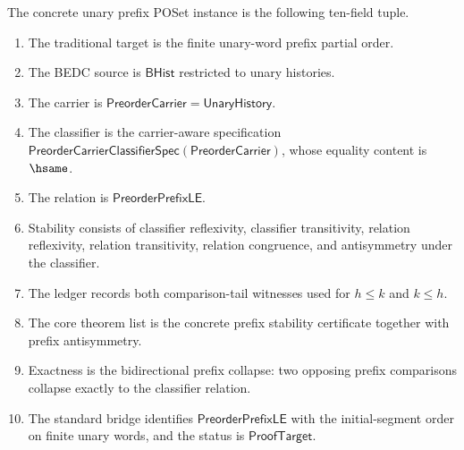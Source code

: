 \begin{definition}
\label{def:concrete-unary-prefix-poset-instance}
The concrete unary prefix POSet instance is the following ten-field tuple.
\begin{enumerate}
  \item The traditional target is the finite unary-word prefix partial order.
  \item The BEDC source is $\mathsf{BHist}$ restricted to unary histories.
  \item The carrier is $\mathsf{PreorderCarrier}=\mathsf{UnaryHistory}$.
  \item The classifier is the carrier-aware specification $\mathsf{PreorderCarrierClassifierSpec}(\mathsf{PreorderCarrier})$, whose equality content is $\hsame$.
  \item The relation is $\mathsf{PreorderPrefixLE}$.
  \item Stability consists of classifier reflexivity, classifier transitivity, relation reflexivity, relation transitivity, relation congruence, and antisymmetry under the classifier.
  \item The ledger records both comparison-tail witnesses used for $h\le k$ and $k\le h$.
  \item The core theorem list is the concrete prefix stability certificate together with prefix antisymmetry.
  \item Exactness is the bidirectional prefix collapse: two opposing prefix comparisons collapse exactly to the classifier relation.
  \item The standard bridge identifies $\mathsf{PreorderPrefixLE}$ with the initial-segment order on finite unary words, and the status is $\mathsf{ProofTarget}$.
\end{enumerate}
\end{definition}

